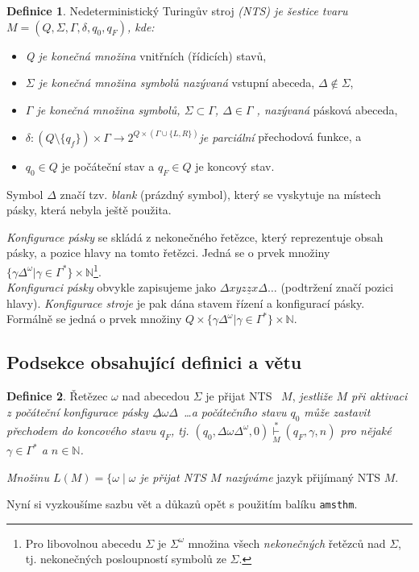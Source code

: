 \documentclass[a4paper, 11pt, twocolumn]{article}
\theoremstyle{definition}
\newtheorem{definition}{Definice}
\theoremstyle{definition}
\begin{document}
\begin{definition}
    
    Nedeterministický Turingův stroj \textit{(NTS) je šestice tvaru $M=(Q,\Sigma,\Gamma,\delta,q_0,q_F)$, kde:}
    \begin{itemize}
        \item \textit{Q je konečná množina} vnitřních (řídicích) stavů,
        \item \textit{$\Sigma$ je konečná množina symbolů nazývaná} vstupní abeceda, $\Delta \notin \Sigma$,
        \item \textit{$\Gamma$ je konečná množina symbolů, $\Sigma \subset \Gamma$, $\Delta \in \Gamma$ , nazývaná} pásková abeceda,
        \item \textit{ $\delta : (Q \setminus \{q_f\}) \times \Gamma \rightarrow 2^{Q\times(\Gamma\cup\{L,R\})}$je parciální} přechodová funkce, a
        \item $q_0 \in Q$ je počáteční stav a $q_F \in Q$ je koncový stav.
    \end{itemize}
    
\end{definition}

Symbol $\Delta$ značí tzv. \textit{blank} (prázdný symbol), který se vyskytuje na místech pásky, která nebyla ještě použita.\par
\textit{Konfigurace pásky} se skládá z nekonečného řetězce, který reprezentuje obsah pásky, a pozice hlavy na tomto řetězci. Jedná se o prvek množiny $\{\gamma\Delta^\omega| \gamma \in \Gamma^*\}\times \mathbb{N}$\footnote{Pro libovolnou abecedu $\Sigma$ je $\Sigma^\omega$ množina všech \textit{nekonečných} řetězců nad $\Sigma$, tj. nekonečných posloupností symbolů ze $\Sigma$.}.\\
\textit{Konfiguraci pásky} obvykle zapisujeme jako ${\Delta xyz\underline{z}x\Delta \dots}$ (podtržení značí pozici hlavy).
\textit{Konfigurace stroje} je pak dána stavem řízení a konfigurací pásky. Formálně se jedná o prvek množiny $Q\times\{\gamma\Delta^\omega|\gamma \in \Gamma^*\}\times \mathbb{N}$.

\subsection{Podsekce obsahující definici a větu}

\begin{definition}\label{def}
    Řetězec $\omega$ nad abecedou $\Sigma$ je přijat NTS~ $M$, \textit{jestliže $M$ při aktivaci z počáteční konfigurace pásky $\underline{\Delta}\omega\Delta$~\dots a počátečního stavu $q_0$ může zastavit přechodem do koncového stavu $q_F$, tj. $(q_0, \Delta\omega\Delta^\omega,0)\overset{*}{\underset{M}{\vdash}} (q_F,\gamma, n)$ pro nějaké $\gamma \in \Gamma^*$ a $n \in \mathbb{N}$.} \par
    \textit{Množinu $L(M) = \{\omega\; |\; \omega$ je přijat \textit{NTS} $M$ nazýváme} jazyk přijímaný NTS $M$.
\end{definition}
Nyní si vyzkoušíme sazbu vět a důkazů opět s použitím balíku \texttt{amsthm}.
\end{document}
